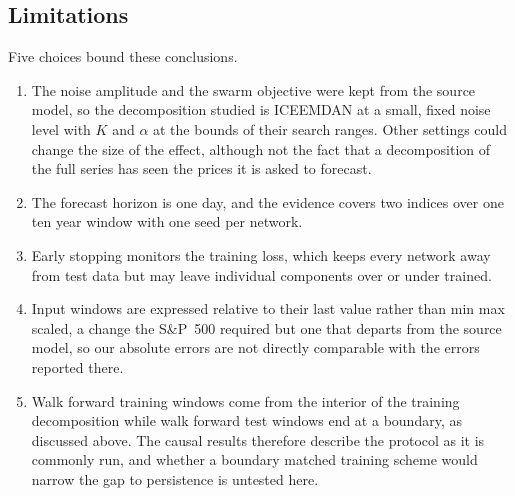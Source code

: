 \subsection{Limitations}
Five choices bound these conclusions.
\begin{enumerate}
\item The noise amplitude and the swarm objective were kept from the source
model, so the decomposition studied is ICEEMDAN at a small, fixed noise level
with $K$ and $\alpha$ at the bounds of their search ranges. Other settings
could change the size of the effect, although not the fact that a
decomposition of the full series has seen the prices it is asked to forecast.
\item The forecast horizon is one day, and the evidence covers two indices
over one ten year window with one seed per network.
\item Early stopping monitors the training loss, which keeps every network
away from test data but may leave individual components over or under
trained.
\item Input windows are expressed relative to their last value rather than
min max scaled, a change the S\&P~500 required but one that departs from the
source model, so our absolute errors are not directly comparable with the
errors reported there.
\item Walk forward training windows come from the interior of the training
decomposition while walk forward test windows end at a boundary, as discussed
above. The causal results therefore describe the protocol as it is commonly
run, and whether a boundary matched training scheme would narrow the gap to
persistence is untested here.
\end{enumerate}
